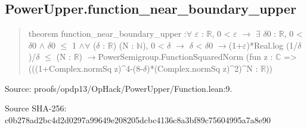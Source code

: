 \documentclass[11pt,a4paper]{article}
\begin{document}
\begin{samepage}
\subsection{PowerUpper.function\_near\_boundary\_upper}
\begin{quote}\small\ttfamily theorem function\_near\_boundary\_upper :\newline     \ensuremath{\forall} \ensuremath{\varepsilon} : \ensuremath{\mathbb{R}}, 0 < \ensuremath{\varepsilon} \ensuremath{\to} \ensuremath{\exists} \ensuremath{\delta}0 : \ensuremath{\mathbb{R}}, 0 < \ensuremath{\delta}0 \ensuremath{\wedge} \ensuremath{\delta}0 \ensuremath{\leq} 1 \ensuremath{\wedge}\newline       \ensuremath{\forall} (\ensuremath{\delta} : \ensuremath{\mathbb{R}}) (N : \ensuremath{\mathbb{N}}), 0 < \ensuremath{\delta} \ensuremath{\to} \ensuremath{\delta} < \ensuremath{\delta}0 \ensuremath{\to}\newline         (1+\ensuremath{\varepsilon})*Real.log (1/\ensuremath{\delta})/\ensuremath{\delta} \ensuremath{\leq} (N : \ensuremath{\mathbb{R}}) \ensuremath{\to}\newline         PowerSemigroup.FunctionSquaredNorm (fun z : \ensuremath{\mathbb{C}} =>\newline           (((1+Complex.normSq z)\textasciicircum{}4-(8-\ensuremath{\delta})*(Complex.normSq z)\textasciicircum{}2)\textasciicircum{}N : \ensuremath{\mathbb{R}}))\end{quote}
{\small Source: proofs/opdp13/OpHack/PowerUpper/Function.lean:9.\par}

{\small Source SHA-256: c0b278ad2bc4d2d0297a99649e208205dcbc4136c8a3bf89c75604995a7a8e90\par}

\end{samepage}
\end{document}
